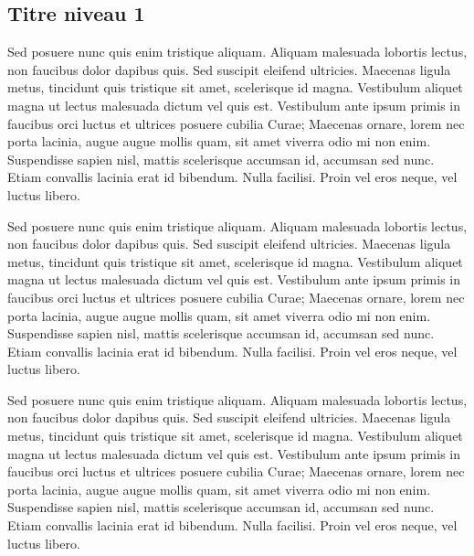 \documentclass{FramateX}
\begin{document}
\begin{refsection}
\section*{Titre niveau 1}
{}

Sed posuere nunc quis enim tristique aliquam. Aliquam malesuada lobortis lectus, non faucibus dolor dapibus quis. Sed suscipit eleifend ultricies. Maecenas ligula metus, tincidunt quis tristique sit amet, scelerisque id magna. Vestibulum aliquet magna ut lectus malesuada dictum vel quis est. Vestibulum ante ipsum primis in faucibus orci luctus et ultrices posuere cubilia Curae; Maecenas ornare, lorem nec porta lacinia, augue augue mollis quam, sit amet viverra odio mi non enim. Suspendisse sapien nisl, mattis scelerisque accumsan id, accumsan sed nunc. Etiam convallis lacinia erat id bibendum. Nulla facilisi. Proin vel eros neque, vel luctus libero.


Sed posuere nunc quis enim tristique aliquam. Aliquam malesuada lobortis lectus, non faucibus dolor dapibus quis. Sed suscipit eleifend ultricies. Maecenas ligula metus, tincidunt quis tristique sit amet, scelerisque id magna. Vestibulum aliquet magna ut lectus malesuada dictum vel quis est. Vestibulum ante ipsum primis in faucibus orci luctus et ultrices posuere cubilia Curae; Maecenas ornare, lorem nec porta lacinia, augue augue mollis quam, sit amet viverra odio mi non enim. Suspendisse sapien nisl, mattis scelerisque accumsan id, accumsan sed nunc. Etiam convallis lacinia erat id bibendum. Nulla facilisi. Proin vel eros neque, vel luctus libero.


Sed posuere nunc quis enim tristique aliquam. Aliquam malesuada lobortis lectus, non faucibus dolor dapibus quis. Sed suscipit eleifend ultricies. Maecenas ligula metus, tincidunt quis tristique sit amet, scelerisque id magna. Vestibulum aliquet magna ut lectus malesuada dictum vel quis est. Vestibulum ante ipsum primis in faucibus orci luctus et ultrices posuere cubilia Curae; Maecenas ornare, lorem nec porta lacinia, augue augue mollis quam, sit amet viverra odio mi non enim. Suspendisse sapien nisl, mattis scelerisque accumsan id, accumsan sed nunc. Etiam convallis lacinia erat id bibendum. Nulla facilisi. Proin vel eros neque, vel luctus libero.


\end{refsection}


                        
\end{document}
